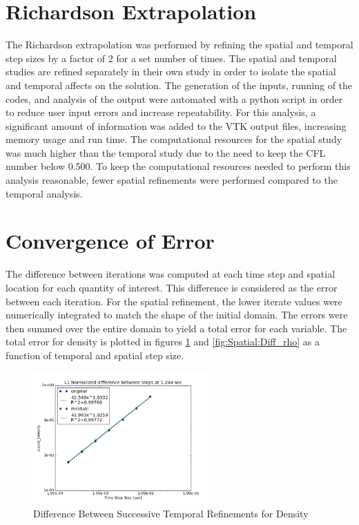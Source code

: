 \section{Richardson Extrapolation}

The Richardson extrapolation was performed by refining the spatial and temporal
step sizes by a factor of 2 for a set number of times. The spatial and temporal
studies are refined separately in their own study in order to isolate the
spatial and temporal affects on the solution. The generation of the inputs,
running of the codes, and analysis of the output were automated with a python
\cite{python} script in order to reduce user input errors and increase
repeatability. For this analysis, a significant amount of information was added
to the VTK output files, increasing memory usage and run time. The computational
resources for the spatial study was much higher than the temporal study due to
the need to keep the CFL number below 0.500. To keep the computational resources
needed to perform this analysis reasonable, fewer spatial refinements were
performed compared to the temporal analysis.

\section{Convergence of Error}

The difference between iterations was computed at each time step and spatial
location for each quantity of interest. This difference is considered as the
error between each iteration. For the spatial refinement, the lower iterate
values were numerically integrated to match the shape of the initial domain. The
errors were then summed over the entire domain to yield a total error for each
variable. The total error for density is plotted in figures
\ref{fig:Temporal:Diff_rho} and \ref{fig:Spatial:Diff_rho} as a function of
temporal and spatial step size.

\begin{figure}[!h]
	\centering
	\includegraphics[width=0.60\textwidth]{images/Temporal_Study/Difference_rho}
	\caption{Difference Between Successive Temporal Refinements for Density}
	\label{fig:Temporal:Diff_rho}
\end{figure} 

